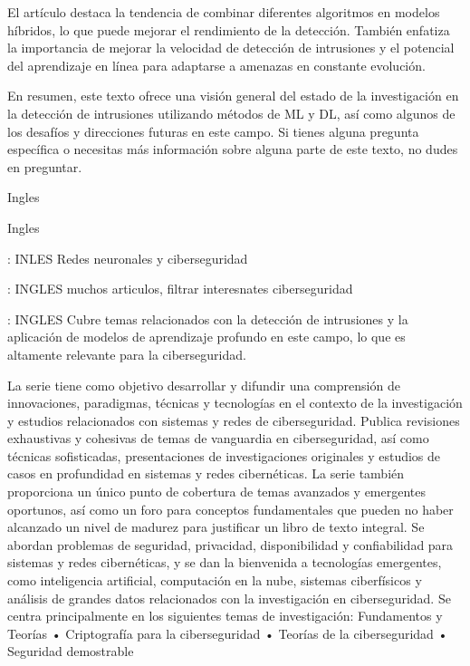 \documentclass[11pt, a4paper]{article} %
\begin{document}
El artículo destaca la tendencia de combinar diferentes algoritmos en modelos híbridos, lo que puede mejorar el rendimiento de la detección. También enfatiza la importancia de mejorar la velocidad de detección de intrusiones y el potencial del aprendizaje en línea para adaptarse a amenazas en constante evolución.

En resumen, este texto ofrece una visión general del estado de la investigación en la detección de intrusiones utilizando métodos de ML y DL, así como algunos de los desafíos y direcciones futuras en este campo. Si tienes alguna pregunta específica o necesitas más información sobre alguna parte de este texto, no dudes en preguntar.


\citep{martinez2019machine} Ingles


\citep{sarker2022machine} Ingles


\citep{stamp2022artificial} : INLES Redes neuronales y ciberseguridad

\citep{haber2017data} : INGLES muchos articulos, filtrar interesnates ciberseguridad

\citep{kim2018network} : INGLES Cubre temas relacionados con la detección de intrusiones y la aplicación de modelos de aprendizaje profundo en este campo, lo que es altamente relevante para la ciberseguridad.

La serie tiene como objetivo desarrollar y difundir una comprensión de innovaciones, paradigmas, técnicas y tecnologías en el contexto de la investigación y estudios relacionados con sistemas y redes de ciberseguridad. Publica revisiones exhaustivas y cohesivas de temas de vanguardia en ciberseguridad, así como técnicas sofisticadas, presentaciones de investigaciones originales y estudios de casos en profundidad en sistemas y redes cibernéticas. La serie también proporciona un único punto de cobertura de temas avanzados y emergentes oportunos, así como un foro para conceptos fundamentales que pueden no haber alcanzado un nivel de madurez para justificar un libro de texto integral. Se abordan problemas de seguridad, privacidad, disponibilidad y confiabilidad para sistemas y redes cibernéticas, y se dan la bienvenida a tecnologías emergentes, como inteligencia artificial, computación en la nube, sistemas ciberfísicos y análisis de grandes datos relacionados con la investigación en ciberseguridad. Se centra principalmente en los siguientes temas de investigación:
Fundamentos y Teorías
• Criptografía para la ciberseguridad
• Teorías de la ciberseguridad
• Seguridad demostrable
\end{document}
